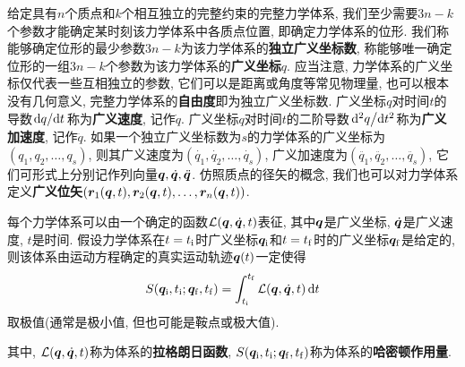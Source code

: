 给定具有$ n $个质点和$ k $个相互独立的完整约束的完整力学体系, 我们至少需要$ 3n-k $个参数才能确定某时刻该力学体系中各质点位置, 即确定力学体系的位形. 我们称能够确定位形的最少参数$ 3n-k $为该力学体系的\textbf{独立广义坐标数}, 称能够唯一确定位形的一组$ 3n-k $个参数为该力学体系的\textbf{广义坐标}$ q $. 应当注意, 力学体系的广义坐标仅代表一些互相独立的参数, 它们可以是距离或角度等常见物理量, 也可以根本没有几何意义, 完整力学体系的\textbf{自由度}即为独立广义坐标数. 广义坐标$ q $对时间$ t $的导数$ \dv*{q}{t} $称为\textbf{广义速度}, 记作$ \dot{q} $. 广义坐标$ q $对时间$ t $的二阶导数$ \dv*[2]{q}{t} $称为\textbf{广义加速度}, 记作$ \ddot{q} $. 如果一个独立广义坐标数为$ s $的力学体系的广义坐标为$ (q_1,q_2,\ldots,q_s) $, 则其广义速度为$ (\dot{q_1},\dot{q_2},\ldots,\dot{q_s}) $, 广义加速度为$ (\ddot{q_1},\ddot{q_2},\ldots,\ddot{q_s}) $, 它们可形式上分别记作列向量$ \vb*{q},\dot{\vb*{q}},\ddot{\vb*{q}} $. 仿照质点的径矢的概念, 我们也可以对力学体系定义\textbf{广义位矢}$ (\vb*{r}_1(\vb*{q},t),\vb*{r}_2(\vb*{q},t),\ldots,\vb*{r}_n(\vb*{q},t)) $.

\begin{postulate}[最小作用量原理]\label{pos:最小作用量原理}
    每个力学体系可以由一个确定的函数$ \mathcal{L}(\vb*{q},\dot{\vb*{q}},t) $表征, 其中$ \vb*{q} $是广义坐标, $ \dot{\vb*{q}} $是广义速度, $ t $是时间. 假设力学体系在$ t=t_{\mathrm{i}} $时广义坐标$ \vb*{q}_{\mathrm{i}} $和$ t=t_{\mathrm{f}} $时的广义坐标$ \vb*{q}_{\mathrm{f}} $是给定的, 则该体系由运动方程确定的真实运动轨迹$ \vb*{q}(t) $一定使得
    \begin{equation}
        S(\vb*{q}_{\mathrm{i}},t_{\mathrm{i}};\vb*{q}_{\mathrm{f}},t_{\mathrm{f}})=\int_{t_{\mathrm{i}}}^{t_{\mathrm{f}}} \mathcal{L}(\vb*{q},\dot{\vb*{q}},t) \dd{t}
    \end{equation}
    取极值(通常是极小值, 但也可能是鞍点或极大值).
\end{postulate}
其中, $ \mathcal{L}(\vb*{q},\dot{\vb*{q}},t) $称为体系的\textbf{拉格朗日函数}, $ S(\vb*{q}_{\mathrm{i}},t_{\mathrm{i}};\vb*{q}_{\mathrm{f}},t_{\mathrm{f}}) $称为体系的\textbf{哈密顿作用量}.

